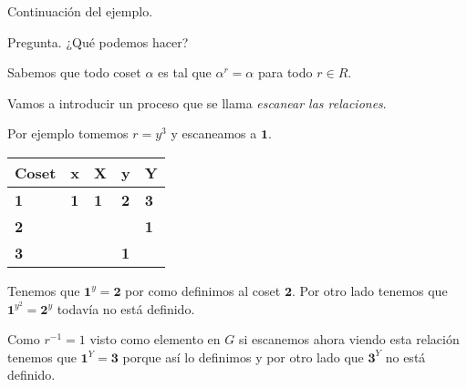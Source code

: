 \documentclass[aspectratio=169, 9pt]{beamer}
\begin{document}
\begin{frame}[fragile]{Continuación del ejemplo.}
	
\begin{alertblock}{Pregunta.}
	¿Qué podemos hacer?
\end{alertblock}
\pause
Sabemos que todo coset $\alpha$ es tal que $\alpha^r = \alpha$ para todo $r \in R$.
\pause

Vamos a introducir un proceso que se llama \textit{escanear las relaciones}.

\pause
Por ejemplo tomemos $r = y^3$ y escaneamos a $\textbf{1}$.


\begin{table}[]
	\begin{tabular}{|l|l|l|l|l|}
		\hline
		Coset     & x          & X          & y          & Y          \\ \hline
		\textbf{1} & \textbf{1} & \textbf{1} & \textbf{2} & \textbf{3} \\ \hline
		\textbf{2} &            &            &            &  \textbf{1}          \\ \hline
		\textbf{3} &            &            &     \textbf{1}       &            \\ \hline
	\end{tabular}
\end{table}
\pause

Tenemos que $\textbf{1}^y = \textbf{2}$ por como definimos al coset $\textbf{2}$. 
Por otro lado tenemos que $\textbf{1}^{y^2} = \textbf{2}^y$ todavía no está definido.
\pause


Como $r^{-1} = 1$ visto como elemento en $G$ si escanemos ahora viendo esta relación tenemos que $\textbf{1}^{Y} = \textbf{3}$ porque así lo definimos y por otro lado que $\textbf{3}^{Y}$ no está definido.
\pause

\end{frame}
\end{document}
